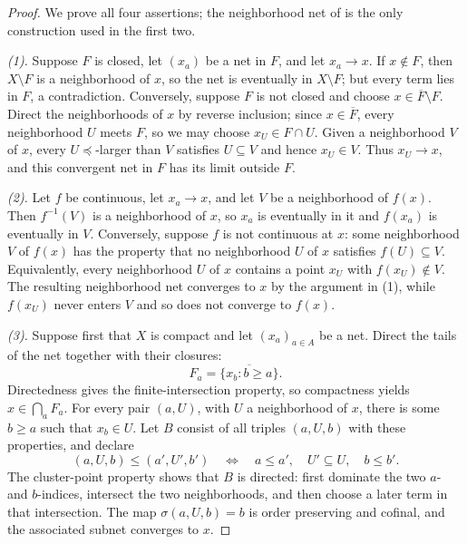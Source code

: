 \begin{proof}
We prove all four assertions; the neighborhood net of
 is the only construction used in the first
two.

\emph{(1).}  Suppose $F$ is closed, let $(x_a)$ be a net in $F$, and let
$x_a\to x$.  If $x\notin F$, then $X\setminus F$ is a neighborhood of $x$, so
the net is eventually in $X\setminus F$; but every term lies in $F$, a
contradiction.  Conversely, suppose $F$ is not closed and choose
$x\in\overline F\setminus F$.  Direct the neighborhoods of $x$ by reverse
inclusion; since $x\in\overline F$, every neighborhood $U$ meets $F$, so we
may choose $x_U\in F\cap U$.  Given a neighborhood $V$ of $x$, every
$U\preceq$-larger than $V$ satisfies $U\subseteq V$ and hence $x_U\in V$.
Thus $x_U\to x$, and this convergent net in $F$ has its limit outside $F$.

\emph{(2).}  Let $f$ be continuous, let $x_a\to x$, and let $V$ be a
neighborhood of $f(x)$.  Then $f^{-1}(V)$ is a neighborhood of $x$, so $x_a$
is eventually in it and $f(x_a)$ is eventually in $V$.  Conversely, suppose
$f$ is not continuous at $x$: some neighborhood $V$ of $f(x)$ has the property
that no neighborhood $U$ of $x$ satisfies $f(U)\subseteq V$.  Equivalently,
every neighborhood $U$ of $x$ contains a point $x_U$ with
$f(x_U)\notin V$.  The resulting neighborhood net converges to $x$ by the
argument in (1), while $f(x_U)$ never enters $V$ and so does not converge to
$f(x)$.

\emph{(3).}  Suppose first that $X$ is compact and let $(x_a)_{a\in A}$ be a
net.  Direct the tails of the net together with their closures:
\[
                  F_a=\overline{\{x_b:b\geq a\}}.
\]
Directedness gives the finite-intersection property, so compactness yields
$x\in\bigcap_aF_a$.  For every pair $(a,U)$, with $U$ a neighborhood of
$x$, there is some $b\geq a$ such that $x_b\in U$.  Let $B$ consist of all
triples $(a,U,b)$ with these properties, and declare
\[
 (a,U,b)\leq(a',U',b')
 \quad\Longleftrightarrow\quad
 a\leq a',\quad U'\subseteq U,\quad b\leq b'.
\]
The cluster-point property shows that $B$ is directed: first dominate the
two $a$- and $b$-indices, intersect the two neighborhoods, and then choose a
later term in that intersection.  The map
$\sigma(a,U,b)=b$ is order preserving and cofinal, and the associated subnet
converges to $x$.


\end{proof}
